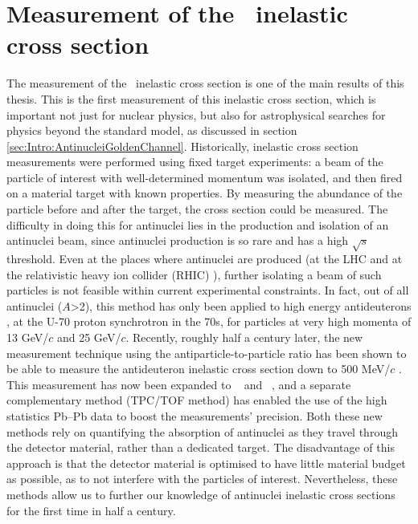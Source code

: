 







\section{Measurement of the \ahe\ inelastic cross section}\label{sec:ResHe3SigmaInel}
The measurement of the \ahe\ inelastic cross section is one of the main results of this thesis. This is the first measurement of this inelastic cross section, which is important not just for nuclear physics, but also for astrophysical searches for physics beyond the standard model, as discussed in section \ref{sec:Intro:AntinucleiGoldenChannel}. Historically, inelastic cross section measurements were performed using fixed target experiments: a beam of the particle of interest with well-determined momentum was isolated, and then fired on a material target with known properties. By measuring the abundance of the particle before and after the target, the cross section could be measured. The difficulty in doing this for antinuclei lies in the production and isolation of an antinuclei beam, since antinuclei production is so rare and has a high $\sqrt{s}$ threshold. Even at the places where antinuclei are produced (at the LHC and at the relativistic heavy ion collider (RHIC) \cite{RHIC}), further isolating a beam of such particles is not feasible within current experimental constraints. In fact, out of all antinuclei ($A$>2), this method has only been applied to high energy antideuterons \cite{Binon:1970yu, Denisov:1971im}, at the U-70 proton synchrotron in the 70s, for particles at very high momenta of 13 GeV/$c$ and 25 GeV/$c$. Recently, roughly half a century later, the new measurement technique using the antiparticle-to-particle ratio has been shown to be able to measure the antideuteron inelastic cross section down to 500 MeV/$c$ \cite{antideuteronXS}. This measurement has now been expanded to \ahe\ \cite{antiHe3XS} and \atrit\ , and a separate complementary method (TPC/TOF method) has enabled the use of the high statistics Pb--Pb data to boost the measurements' precision. Both these new methods rely on quantifying the absorption of antinuclei as they travel through the detector material, rather than a dedicated target. The disadvantage of this approach is that the detector material is optimised to have little material budget as possible, as to not interfere with the particles of interest. Nevertheless, these methods allow us to further our knowledge of antinuclei inelastic cross sections for the first time in half a century.

